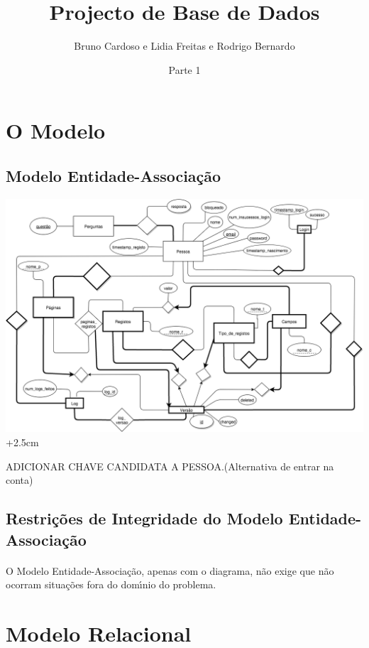 \documentclass[11pt,a4paper]{article}
\title{\textbf{Projecto de Base de Dados}}
\author{Bruno Cardoso e Lidia Freitas e Rodrigo Bernardo}
\affil{Instituto Superior T\'{e}cnico}
\date{Parte 1}
\begin{document}
\setlength{\pdfpxdimen}{1in/250}
\maketitle

\newpage
\setcounter{page}{1}

\tableofcontents %
\newpage

\section{O Modelo}
\subsection{Modelo Entidade-Associa\c{c}\~ao}

\advance\leftskip-2.5cm
\includegraphics[width=1.40\textwidth]{modelo-ea.png}
\advance\leftskip+2.5cm

ADICIONAR CHAVE CANDIDATA A PESSOA.(Alternativa de entrar na conta)
\newpage
\subsection{Restri\c{c}\~oes de Integridade do Modelo Entidade-Associa\c{c}\~ao}

\paragraph{}

O Modelo Entidade-Associa\c{c}\~{a}o, apenas com o diagrama, n\~{a}o exige que n\~{a}o ocorram situa\c{c}\~{o}es fora do dom\'{\i}nio do problema.




\section{Modelo Relacional}
\end{document}
